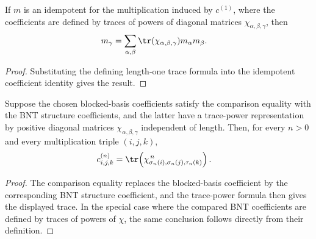 \begin{lemma}%
    \label{thm:mpdo_bnt_label_idempotent_eq_sum_of_chi_trace}
    \leanok
    If $m$ is an idempotent for the multiplication induced by $c^{(1)}$,
    where the coefficients are defined by traces of powers of diagonal
    matrices $\chi_{\alpha,\beta,\gamma}$, then
    \begin{align}
        m_\gamma
         & =
        \sum_{\alpha,\beta}
        \tr(\chi_{\alpha,\beta,\gamma})
        m_\alpha m_\beta.
        \notag
    \end{align}
\end{lemma}
\begin{proof}\leanok
    Substituting the defining length-one trace formula into the idempotent
    coefficient identity gives the result.
\end{proof}

\begin{lemma}%
    \label{lem:mpdo_bnt_blocked_basis_coefficient_eq_trace_pow}
    \leanok
    Suppose the chosen blocked-basis coefficients satisfy the comparison
    equality with the BNT structure coefficients, and the latter have a
    trace-power representation by positive diagonal matrices
    $\chi_{\alpha,\beta,\gamma}$ independent of length. Then, for every
    $n>0$ and every multiplication triple $(i,j,k)$,
    \begin{align}
        c^{(n)}_{i,j,k}
         & =
        \tr\!\left(\chi_{\sigma_n(i),\sigma_n(j),\tau_n(k)}^{\,n}\right).
        \notag
    \end{align}
\end{lemma}
\begin{proof}\leanok
    The comparison equality replaces the blocked-basis coefficient by the
    corresponding BNT structure coefficient, and the trace-power formula then
    gives the displayed trace.
    In the special case where the compared BNT coefficients are
    defined by traces of powers of $\chi$, the same conclusion
    follows directly from their definition.
\end{proof}

